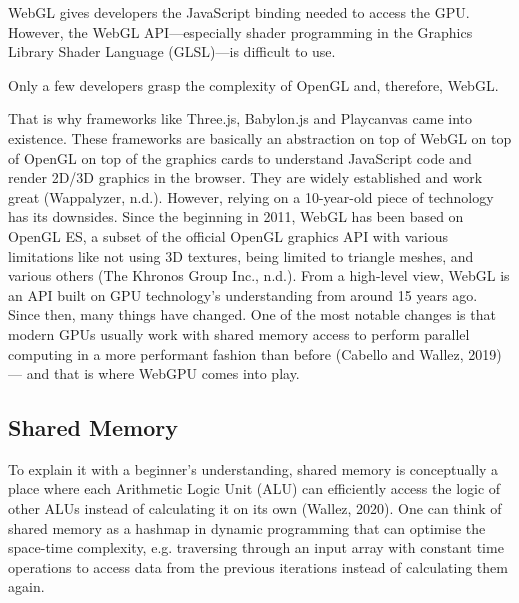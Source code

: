 \documentclass[10pt]{article}
\begin{document}
\begin{sloppypar}
  WebGL gives developers the JavaScript binding needed to access the GPU. However, the WebGL API—especially shader programming in the Graphics Library Shader Language (GLSL)—is difficult to use.

  Only a few developers grasp the complexity of OpenGL and, therefore, WebGL.

  That is why frameworks like Three.js, Babylon.js and Playcanvas came into existence. These frameworks are basically an abstraction on top of WebGL on top of OpenGL on top of the graphics cards to understand JavaScript code and render 2D/3D graphics in the browser. They are widely established and work great (Wappalyzer, n.d.). However, relying on a 10-year-old piece of technology has its downsides. Since the beginning in 2011, WebGL has been based on OpenGL ES, a subset of the official OpenGL graphics API with various limitations like not using 3D textures, being limited to triangle meshes, and various others (The Khronos Group Inc., n.d.). From a high-level view, WebGL is an API built on GPU technology’s understanding from around 15 years ago. Since then, many things have changed. One of the most notable changes is that modern GPUs usually work with shared memory access to perform parallel computing in a more performant fashion than before (Cabello and Wallez, 2019) — and that is where WebGPU comes into play.

  \subsection{Shared Memory}
  \label{subsec:shared-memory}

  To explain it with a beginner’s understanding, shared memory is conceptually a place where each Arithmetic Logic Unit (ALU) can efficiently access the logic of other ALUs instead of calculating it on its own (Wallez, 2020). One can think of shared memory as a hashmap in dynamic programming that can optimise the space-time complexity, e.g. traversing through an input array with constant time operations to access data from the previous iterations instead of calculating them again.


\end{sloppypar}
\end{document}
